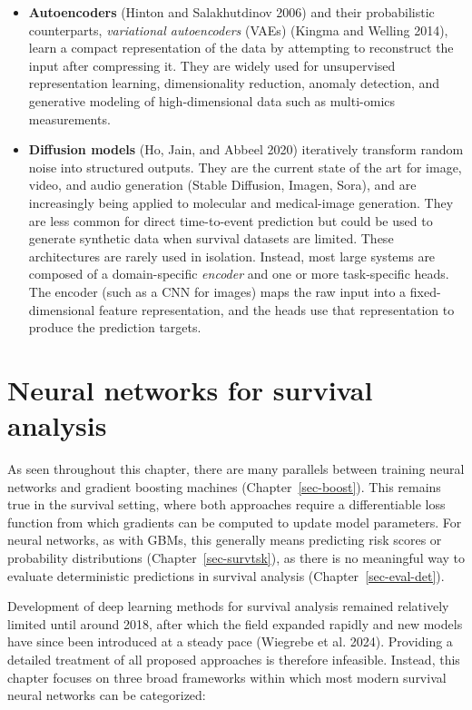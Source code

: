 \documentclass[
  letterpaper,
  krantz2]{style/krantz}
\begin{document}
\begin{itemize}
\item
  \textbf{Autoencoders} (Hinton and Salakhutdinov 2006) and their
  probabilistic counterparts, \emph{variational autoencoders} (VAEs)
  (Kingma and Welling 2014), learn a compact representation of the data
  by attempting to reconstruct the input after compressing it. They are
  widely used for unsupervised representation learning, dimensionality
  reduction, anomaly detection, and generative modeling of
  high-dimensional data such as multi-omics
  measurements.
\item
  \textbf{Diffusion models} (Ho, Jain, and Abbeel 2020) iteratively
  transform random noise into structured outputs. They are the current
  state of the art for image, video, and audio generation (Stable
  Diffusion, Imagen, Sora), and are increasingly being applied to
  molecular and medical-image generation. They are less common for
  direct time-to-event prediction but could be used to generate
  synthetic data when survival datasets are
  limited. These architectures are
  rarely used in isolation. Instead, most large systems are composed of
  a domain-specific \emph{encoder} and one or more task-specific heads.
  The encoder (such as a CNN for images) maps the raw input into a
  fixed-dimensional feature representation, and the heads use that
  representation to produce the prediction targets.
\end{itemize}

\section{Neural networks for survival analysis}\label{sec-nnet-surv}

As seen throughout this chapter, there are many parallels between
training neural networks and gradient boosting
machines (Chapter~\ref{sec-boost}).
This remains true in the survival setting, where both approaches require
a differentiable loss function from which gradients can be computed to
update model parameters. For neural networks, as with GBMs, this
generally means predicting risk scores or probability distributions
(Chapter~\ref{sec-survtsk}), as there is no meaningful way to evaluate
deterministic predictions in survival analysis
(Chapter~\ref{sec-eval-det}). 

Development of deep learning methods for survival analysis remained
relatively limited until around 2018, after which the field expanded
rapidly and new models have since been introduced at a steady pace
(Wiegrebe et al. 2024). Providing a detailed treatment of all proposed
approaches is therefore infeasible. Instead, this chapter focuses on
three broad frameworks within which most modern survival neural networks
can be categorized:
\end{document}
